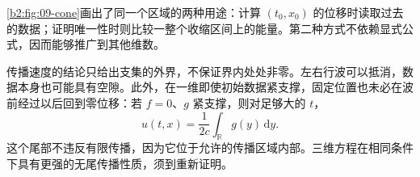 \cref{b2:fig:09-cone}画出了同一个区域的两种用途：计算 \((t_0,x_0)\) 的位移时读取过去的数据；证明唯一性时则比较一整个收缩区间上的能量。第二种方式不依赖显式公式，因而能够推广到其他维数。


传播速度的结论只给出支集的外界，不保证界内处处非零。左右行波可以抵消，数据本身也可能具有空隙。此外，在一维即使初始数据紧支撑，固定位置也未必在波前经过以后回到零位移：若 \(f=0\)、\(g\) 紧支撑，则对足够大的 \(t\)，
\[
 u(t,x)=\dfrac1{2c}\int_{\mathbb R}g(y)\,\mathrm{d}y.
\]
这个尾部不违反有限传播，因为它位于允许的传播区域内部。三维方程在相同条件下具有更强的无尾传播性质，须到重新证明。
